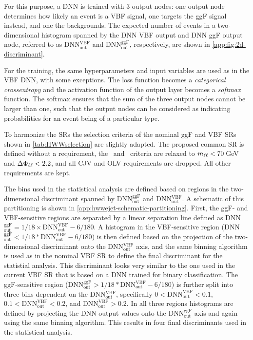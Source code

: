     For this purpose, a DNN is trained with 3 output nodes: one output node determines how likely an event is a VBF signal, one targets the ggF signal instead, and one the backgrounds.
    The expected number of events in a two-dimensional histogram spanned by the DNN VBF output and DNN ggF output node, referred to as DNN$_\mathrm{out}^\mathrm{VBF}$ and DNN$_\mathrm{out}^\mathrm{ggF}$, respectively, are shown in \cref{app:fig:2d-discriminant}.

    For the training, the same hyperparameters and input variables are used as in the VBF DNN, with some exceptions. The loss function becomes a \emph{categorical crossentropy} and the activation function of the output layer becomes a \emph{softmax} function.
    The softmax ensures that the sum of the three output nodes cannot be larger than one, such that the output nodes can be considered as indicating probabilities for an event being of a particular type.

    To harmonize the \TwoJet SRs the selection criteria of the nominal ggF \TwoJet and VBF \TwoJet SRs shown in \cref{tab:HWWselection} are slightly adapted.
    The proposed common \TwoJet SR is defined without a \pTmiss requirement, the \mll\ and \dphill\ criteria are relaxed to $m_{\ell\ell} < 70\,$GeV and $\Delta\Phi_{\ell\ell} < 2.2$, and all CJV and OLV requirements are dropped. All other requirements are kept.

    The bins used in the statistical analysis are defined based on regions in the two-dimensional discriminant spanned by DNN$_\mathrm{out}^\mathrm{ggF}$ and DNN$_\mathrm{out}^\mathrm{VBF}$. A schematic of this partitioning is shown in \cref{app:hwwejet-schematic-partitioning}.
    First, the ggF- and VBF-sensitive regions are separated by a linear separation line defined as DNN$_\mathrm{out}^\mathrm{ggF}= 1/18 \times \text{DNN}_\mathrm{out}^\mathrm{VBF} - 6/180$.
    A histogram in the VBF-sensitive region (DNN$_\mathrm{out}^\mathrm{ggF} < 1/18 * \text{DNN}_\mathrm{out}^\mathrm{VBF} - 6/180$) is then defined based on the projection of the two-dimensional discriminant onto the DNN$_\mathrm{out}^\mathrm{VBF}$ axis, and the same binning algorithm is used as in the nominal VBF SR to define the final discriminant for the statistial analysis. This discriminant looks very similar to the one used in the current VBF \TwoJet SR that is based on a DNN trained for binary classification.
    The ggF-sensitive region (DNN$_\mathrm{out}^\mathrm{ggF}> 1/18 * \text{DNN}_\mathrm{out}^\mathrm{VBF} - 6/180$) is further split into three bins dependent on the DNN$_\mathrm{out}^\mathrm{VBF}$, specifically $0 < \text{DNN}_\mathrm{out}^\mathrm{VBF} < 0.1$, $0.1 < \text{DNN}_\mathrm{out}^\mathrm{VBF} < 0.2$, and $\text{DNN}_\mathrm{out}^\mathrm{VBF} > 0.2$.
    In all three regions histograms are defined by projecting the DNN output values onto the DNN$_\mathrm{out}^\mathrm{ggF}$ axis and again using the same binning algorithm.
    This results in four final discriminants used in the statistical analysis.

